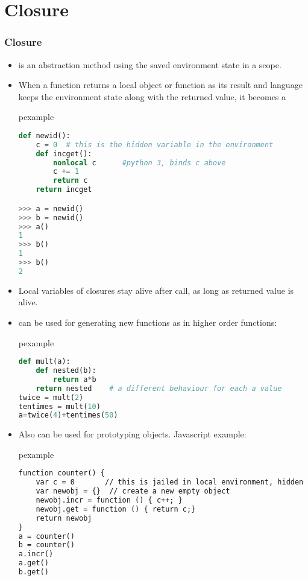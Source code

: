 \section{Closure}
\begin{frame}[fragile]
\frametitle{Closure}
\small
\begin{itemize}
\item {} is an abstraction method using the saved environment state in a scope.
\item When a function returns a local object or function as its result and 
language keeps the environment state along with the returned value, 
it becomes a \\[1em]

\begin{beamercolorbox}{pexample}
\begin{lstlisting}[language=Python,basicstyle=\tiny\tt]
def newid():
    c = 0  # this is the hidden variable in the environment
    def incget():
        nonlocal c      #python 3, binds c above
        c += 1
        return c
    return incget

>>> a = newid()
>>> b = newid()
>>> a()
1
>>> b()
1
>>> b()
2
\end{lstlisting}
\end{beamercolorbox}
\end{itemize}
\end{frame}

\begin{frame}[fragile]
\small
\begin{itemize}
\item Local variables of closures stay alive after call, as long as returned value is alive.
\item {} can be used for generating new functions as in higher order functions:\\[.5em]
\begin{beamercolorbox}{pexample}
\begin{lstlisting}[language=Python,basicstyle=\tiny\tt]
def mult(a):
    def nested(b):
        return a*b
    return nested    # a different behaviour for each a value
twice = mult(2)
tentimes = mult(10)
a=twice(4)+tentimes(50)
\end{lstlisting}
\end{beamercolorbox}
\item Also can be used for prototyping objects. Javascript example:\\[.5em]
\begin{beamercolorbox}{pexample}
\begin{lstlisting}[language=HTML,basicstyle=\tiny\tt]
function counter() {
    var c = 0       // this is jailed in local environment, hidden
    var newobj = {}  // create a new empty object
    newobj.incr = function () { c++; }
    newobj.get = function () { return c;}
    return newobj
}
a = counter()
b = counter()
a.incr()
a.get()
b.get()
\end{lstlisting}
\end{beamercolorbox}
\end{itemize}
\end{frame}

